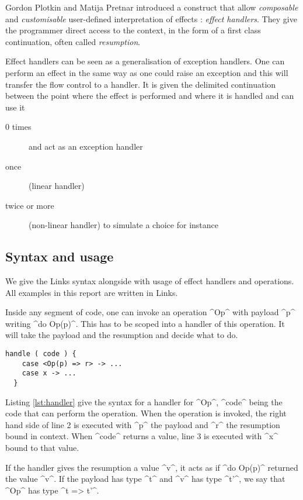 \documentclass[nonacm=true, language=french, language=english]{acmart}
\begin{document}
Gordon Plotkin and Matija Pretnar \cite{} introduced a construct that allow \emph{composable} and \emph{customisable} user-defined interpretation of effects : \emph{effect handlers}. They give the programmer direct access to the context, in the form of a first class continuation, often called \emph{resumption}.

Effect handlers can be seen as a generalisation of exception handlers. One can perform an effect in the same way as one could raise an exception and this will transfer the flow control to a handler. It is given the delimited continuation between the point where the effect is performed and where it is handled and can use it
\begin{description}
  \item[0 times] and act as an exception handler
  \item[once] (linear handler)
  \item[twice or more] (non-linear handler) to simulate a choice for instance
\end{description}


\subsection{Syntax and usage}

We give the Links syntax alongside with usage of effect handlers and operations. All examples in this report are written in Links.

Inside any segment of code, one can invoke an operation ^Op^ with payload ^p^ writing ^do Op(p)^. This has to be scoped into a handler of this operation. It will take the payload and the resumption and decide what to do.

\begin{lstlisting}[caption=Handler,label=lst:handler]
  handle ( code ) {
    case <Op(p) => r> -> ...
    case x -> ...
  }
\end{lstlisting}

Listing \ref{lst:handler} give the syntax for a handler for ^Op^, ^code^ being the code that can perform the operation. When the operation is invoked, the right hand side of line 2 is executed with ^p^ the payload and ^r^ the resumption bound in context. When ^code^ returns a value, line 3 is executed with ^x^ bound to that value.

If the handler gives the resumption a value ^v^, it acts as if ^do Op(p)^ returned the value ^v^. If the payload has type ^t^ and ^v^ has type ^t'^, we say that ^Op^ has type ^t => t'^.
\end{document}

